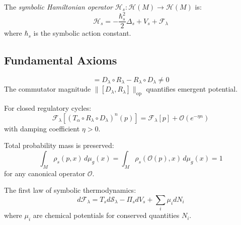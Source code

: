 \begin{definition}
\label{definition:bk6_symbolic_hamiltonian_complete}
The \emph{symbolic Hamiltonian operator} $\mathcal{H}_s : \mathcal{H}(M) \to \mathcal{H}(M)$ is:
\begin{equation}
\mathcal{H}_s = -\frac{\hbar_s^2}{2} \Delta_s + V_s + \mathcal{F}_\lambda
\end{equation}
where $\hbar_s$ is the symbolic action constant.
\end{definition}

\subsection{Fundamental Axioms}
\label{subsection:bk6_fundamental_axioms}

\begin{axiom}
\label{axiom:bk6_non_commutativity_evolution_reflection}
\begin{equation}
[D_\lambda, R_\lambda] = D_\lambda \circ R_\lambda - R_\lambda \circ D_\lambda \neq 0
\end{equation}
The commutator magnitude $\|[D_\lambda, R_\lambda]\|_{\text{op}}$ quantifies emergent potential.
\end{axiom}

\begin{axiom}
\label{axiom:bk6_map_equilibrium_invariance_complete}
For closed regulatory cycles:
\begin{equation}
\mathcal{F}_\lambda[(T_\alpha \circ R_\lambda \circ D_\lambda)^n(p)] = \mathcal{F}_\lambda[p] + \mathcal{O}(e^{-\eta n})
\end{equation}
with damping coefficient $\eta > 0$.
\end{axiom}

\begin{axiom}
\label{axiom:bk6_symbolic_mass_conservation_complete}
Total probability mass is preserved:
\begin{equation}
\int_M \rho_s(p,x) \, d\mu_g(x) = \int_M \rho_s(\mathcal{O}(p),x) \, d\mu_g(x) = 1
\end{equation}
for any canonical operator $\mathcal{O}$.
\end{axiom}

\begin{axiom}
\label{axiom:bk6_thermodynamic_consistency}
The first law of symbolic thermodynamics:
\begin{equation}
d\mathcal{F}_\lambda = T_s d\mathcal{S}_\lambda - \Pi_s dV_s + \sum_i \mu_i dN_i
\end{equation}
where $\mu_i$ are chemical potentials for conserved quantities $N_i$.
\end{axiom}

